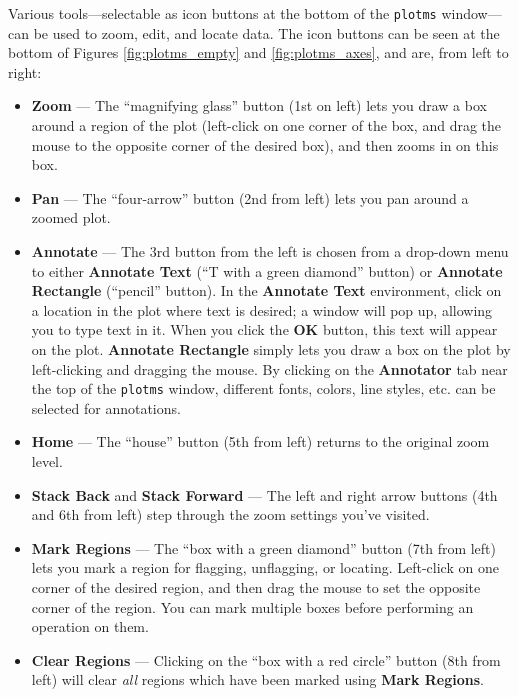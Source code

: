 Various tools---selectable as icon buttons at the bottom of the {\tt plotms} window---can be used to zoom, edit, and locate data. The icon buttons can be seen at the bottom of Figures \ref{fig:plotms_empty} and \ref{fig:plotms_axes}, and are, from left to right:
\begin{itemize}

\item {\bf Zoom} --- The ``magnifying glass'' button (1st on left) lets you draw a box around a region of the plot (left-click on one corner of the box, and drag the mouse to the opposite corner of the desired box), and then zooms in on this box.  

\item {\bf Pan} --- The ``four-arrow'' button (2nd from left) lets you pan around a zoomed plot.

\item {\bf Annotate} --- The 3rd button from the left is chosen from a
  drop-down menu to either {\bf Annotate Text} (``T with a green
  diamond'' button) or {\bf Annotate Rectangle} (``pencil''
  button). In the {\bf Annotate Text} environment, click on a location
  in the plot where text is desired; a window will pop up, allowing
  you to type text in it. When you click the {\bf OK} button, this
  text will appear on the plot. {\bf Annotate Rectangle} simply lets
  you draw a box on the plot by left-clicking and dragging the
  mouse. By clicking on the {\bf Annotator} tab near the top of the
  {\tt plotms} window, different fonts, colors, line styles, etc. can
  be selected for annotations.

\item {\bf Home} --- The ``house'' button (5th from left) returns to the original zoom level.

\item {\bf Stack Back} and {\bf Stack Forward} --- The left and right
  arrow buttons (4th and 6th from left) step through the zoom settings
  you've visited.

\item {\bf Mark Regions} --- The ``box with a green diamond'' button
  (7th from left) lets you mark a region for flagging, unflagging, or
  locating. Left-click on one corner of the desired region, and then
  drag the mouse to set the opposite corner of the region. You can
  mark multiple boxes before performing an operation on them.

\item {\bf Clear Regions} --- Clicking on the ``box with a red
  circle'' button (8th from left) will clear {\it all} regions which
  have been marked using {\bf Mark Regions}.


\end{itemize}
